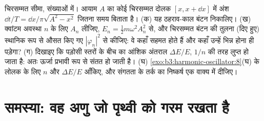 \begin{exercise}[$\star\star\star$]\label{exo:b3:harmonic-oscillator:12}
चिरसम्मत सीमा, संख्याओं में। आयाम $A$ का कोई चिरसम्मत दोलक
$[x, x + \dd x]$ में अंश $\dd
t/T = \dd x/\pi\sqrt{A^2 - x^2}$ जितना समय बिताता है। (क) यह
ठहराव-काल बंटन निकालिए। (ख) क्वांटम अवस्था $n$ के लिए $A_n$ लीजिए, $E_n =
\tfrac12 m\omega^2A_n^2$ से, और चिरसम्मत बंटन की तुलना
(दिए हुए) स्थानिक रूप से औसत किए गए $|\varphi_n|^2$ से कीजिए: वे कहाँ
सहमत होते हैं और कहाँ उन्हें भिन्न होना ही पड़ेगा? (ग) दिखाइए कि
पड़ोसी स्तरों के बीच का आंशिक अंतराल $\Delta E/E$, $1/n$ की तरह लुप्त
हो जाता है: अतः ऊर्जा प्रभावी रूप से संतत हो जाती है। (घ)
\cref{exo:b3:harmonic-oscillator:8}(घ) के लोलक के लिए $n$ और $\Delta
E/E$ आँकिए, और संगतता के तर्क का निष्कर्ष एक वाक्य में दीजिए।
\end{exercise}

\section{समस्या: वह अणु जो पृथ्वी को गरम रखता है}

